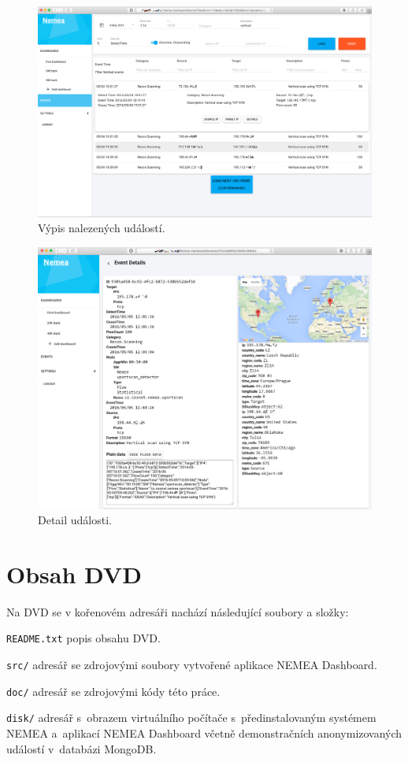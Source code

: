 \begin{figure}[ht]
    \centering
    \includegraphics[width=1\textwidth]{fig/screen_after_2.png}
    \caption{Výpis nalezených událostí.} \label{screen:after:2}
\end{figure}

\begin{figure}[ht]
    \centering
    \includegraphics[width=1\textwidth]{fig/screen_after_3.png}
    \caption{Detail události.} \label{screen:after:3}
\end{figure}



\chapter{Obsah DVD}

Na DVD se v kořenovém adresáři nachází následující soubory a složky:

\begin{description}
    \item \texttt{README.txt} popis obsahu DVD.
    \item \texttt{src/} adresář se zdrojovými soubory vytvořené aplikace NEMEA Dashboard.
    \item \texttt{doc/} adresář se zdrojovými kódy této práce.
    \item \texttt{disk/} adresář s~obrazem virtuálního počítače s~předinstalovaným systémem NEMEA a~aplikací NEMEA Dashboard včetně demonstračních anonymizovaných událostí v~databázi MongoDB.
\end{description}

